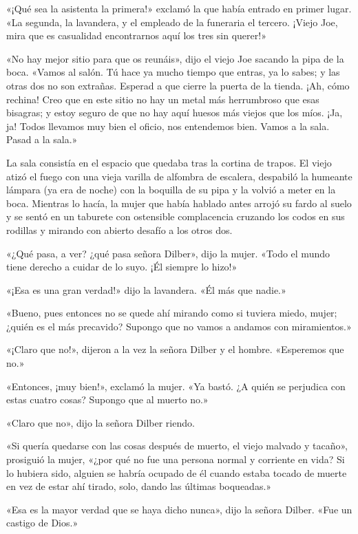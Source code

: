 \documentclass{novela}
\begin{document}
 «¡Qué sea la asistenta la primera!» exclamó la que había entrado en primer lugar. «La segunda, la lavandera, y el empleado de la funeraria el tercero. ¡Viejo Joe, mira que es casualidad encontrarnos aquí los tres sin querer!»

 «No hay mejor sitio para que os reunáis», dijo el viejo Joe sacando la pipa de la boca. «Vamos al salón. Tú hace ya mucho tiempo que entras, ya lo sabes; y las otras dos no son extrañas. Esperad a que cierre la puerta de la tienda. ¡Ah, cómo rechina! Creo que en este sitio no hay un metal más herrumbroso que esas bisagras; y estoy seguro de que no hay aquí huesos más viejos que los míos. ¡Ja, ja! Todos llevamos muy bien el oficio, nos entendemos bien. Vamos a la sala. Pasad a la sala.»

 La sala consistía en el espacio que quedaba tras la cortina de trapos. El viejo atizó el fuego con una vieja varilla de alfombra de escalera, despabiló la humeante lámpara (ya era de noche) con la boquilla de su pipa y la volvió a meter en la boca. Mientras lo hacía, la mujer que había hablado antes arrojó su fardo al suelo y se sentó en un taburete con ostensible complacencia cruzando los codos en sus rodillas y mirando con abierto desafío a los otros dos.

 «¿Qué pasa, a ver? ¿qué pasa señora Dilber», dijo la mujer. «Todo el mundo tiene derecho a cuidar de lo suyo. ¡Él siempre lo hizo!»

 «¡Esa es una gran verdad!» dijo la lavandera. «Él más que nadie.»

 «Bueno, pues entonces no se quede ahí mirando como si tuviera miedo, mujer; ¿quién es el más precavido? Supongo que no vamos a andamos con miramientos.»

 «¡Claro que no!», dijeron a la vez la señora Dilber y el hombre. «Esperemos que no.»

 «Entonces, ¡muy bien!», exclamó la mujer. «Ya bastó. ¿A quién se perjudica con estas cuatro cosas? Supongo que al muerto no.»

 «Claro que no», dijo la señora Dilber riendo.

 «Si quería quedarse con las cosas después de muerto, el viejo malvado y tacaño», prosiguió la mujer, «¿por qué no fue una persona normal y corriente en vida? Si lo hubiera sido, alguien se habría ocupado de él cuando estaba tocado de muerte en vez de estar ahí tirado, solo, dando las últimas boqueadas.»

 «Esa es la mayor verdad que se haya dicho nunca», dijo la señora Dilber. «Fue un castigo de Dios.»
\end{document}
